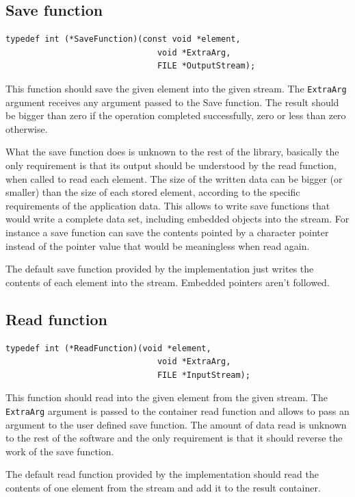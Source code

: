 \documentclass[12pt,a4paper,openany]{memoir} %
\begin{document}
\subsection{Save function}
\begin{verbatim}
typedef int (*SaveFunction)(const void *element, 
                               void *ExtraArg, 
                               FILE *OutputStream);
\end{verbatim}
This function should save the given element into the given stream.  The \verb,ExtraArg, argument receives any argument passed to the Save function.
The result should be bigger than zero if the operation completed successfully, zero or less than zero otherwise.

What the save function does is unknown to the rest of the library, basically the only requirement is that its output should be understood by the
read function, when called to read each element. The size of the written data can be bigger (or smaller) than the size of each stored element,
according to the specific requirements of the application data. This allows to write save functions that would write a complete data set, including
embedded objects into the stream. For instance a save function can save the contents pointed by a character pointer instead of the pointer value 
that would be meaningless when read again.

The default save function provided by the implementation just writes the contents of each element into the stream. Embedded pointers aren't followed.
\subsection{Read function}
\begin{verbatim}
typedef int (*ReadFunction)(void *element, 
                               void *ExtraArg, 
                               FILE *InputStream);
\end{verbatim}
This function should read into the given element from the given stream. The \verb,ExtraArg, argument is passed to the container read function and allows to pass an argument to the user defined save function. The amount of data read is unknown to the rest of the software and the only requirement
is that it should reverse the work of the save function.

The default read function provided by the implementation should read the contents of one element from the stream and add it to the result container.
\end{document}
